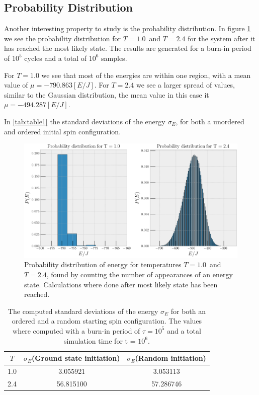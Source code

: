 \documentclass[%
reprint,
nofootinbib,
amsmath,amssymb,
aps,
]{revtex4-1}
\begin{document}
\subsection{Probability Distribution} %
Another interesting property to study is the probability distribution. In figure \ref{fig:ProbabilityDensity} we see the probability distribution for $T=1.0$ and $T=2.4$ for the system after it has reached the most likely state. The results are generated for a burn-in period of $10^5$ cycles and a total of $10^6$ samples. 

For $T=1.0$ we see that most of the energies are within one region, with a mean value of $\mu = -790.863[E/J]$. For $T=2.4$ we see a larger spread of values, similar to the Gaussian distribution, the mean value in this case it $\mu = -494.287[E/J]$.

In \autoref{tab:table1} the standard deviations of the energy $\sigma_E$, for both a unordered and ordered initial spin configuration.
\begin{figure}
	\centering
	\includegraphics[scale=0.7]{./figures/ProbabilityDensity.png}
	\caption{Probability distribution of energy for temperatures $T=1.0$ and $T=2.4$, found by counting the number of appearances of an energy state. Calculations where done after most likely state has been reached.}
	\label{fig:ProbabilityDensity}
\end{figure}

\begin{table}
	\centering
	\caption{The computed standard deviations of the energy $\sigma_E$ for both an ordered and a random starting spin configuration. The values where computed with a burn-in period of $\tau = 10^5$ and a total simulation time for t = $10^6$.}
	\label{tab:table1}
	\begin{tabular}{|c|c|c|}
		\hline
		$T$ & $\sigma_E$(Ground state initiation) & $\sigma_E$(Random initiation)\\
		\hline
		1.0 & 3.055921 &3.053113\\
		2.4 & 56.815100 &57.286746\\
		\hline
	\end{tabular}
\end{table}
\end{document}
